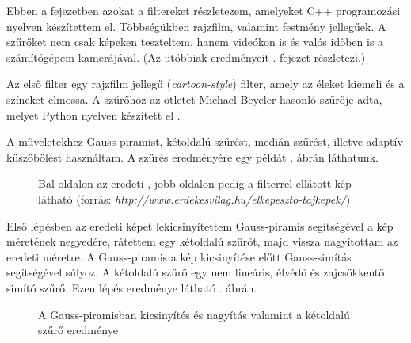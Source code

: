 
\label{chap:filters}

Ebben a fejezetben azokat a filtereket részletezem, amelyeket C++ programozási nyelven készítettem el. Többségükben rajzfilm, valamint festmény jellegűek. A szűrőket nem csak képeken teszteltem, hanem videókon is és valós időben is a számítógépem kamerájával. (Az utóbbiak eredményeit . fejezet részletezi.)


Az első filter egy rajzfilm jellegű (\textit{cartoon-style}) filter, amely az éleket kiemeli és a színeket elmossa. A szűrőhöz az ötletet Michael Beyeler hasonló szűrője adta, melyet Python nyelven készített el \cite{beyeler}.

A műveletekhez Gauss-piramist, kétoldalú szűrést, medián szűrést, illetve adaptív küszöbölést használtam. A szűrés eredményére egy példát . ábrán láthatunk.

\begin{figure}[ht]
\centering
{}
\caption{Bal oldalon az eredeti-, jobb oldalon pedig a filterrel ellátott kép látható (forrás: \textit{http://www.erdekesvilag.hu/elkepeszto-tajkepek/})} 
\label{fig:cartoon1}
\end{figure}


Első lépésben az eredeti képet lekicsinyítettem Gauss-piramis segítségével a kép méretének negyedére, rátettem egy kétoldalú szűrőt, majd vissza nagyítottam az eredeti méretre. A Gauss-piramis a kép kicsinyítése előtt Gauss-simítás segítségével súlyoz. A kétoldalú szűrő egy nem lineáris, élvédő és zajcsökkentő simító szűrő. Ezen lépés eredménye látható . ábrán.

\begin{figure}[ht]
\centering
{}
\caption{A Gauss-piramisban kicsinyítés és nagyítás valamint a kétoldalú szűrő eredménye } 
\label{fig:cartoon2}
\end{figure}


